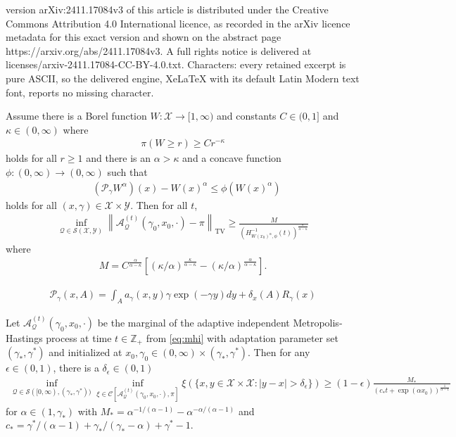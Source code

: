 \documentclass[10pt,a4paper]{amsart}
\newcommand{\A}{\mathcal{A}}
\newcommand{\C}{\mathcal{C}}
\newcommand{\Q}{\mathcal{Q}}
\newcommand{\X}{\mathcal{X}}
\newcommand{\Y}{\mathcal{Y}}
\newcommand{\Z}{\mathbb{Z}}
\newcommand{\eq}[1]{\begin{align*}#1\end{align*}}
\newcommand{\e}{\epsilon}
\newcommand{\norm}[1]{\left\lVert#1\right\rVert}
\renewcommand{\P}{\mathcal{P}}
\renewcommand{\S}{\mathcal{S}}
\begin{document}
version arXiv:2411.17084v3 of this article is distributed under the Creative Commons Attribution 4.0 International licence, as recorded in the arXiv licence metadata for this exact version and shown on the abstract page https://arxiv.org/abs/2411.17084v3. A full rights notice is delivered at licenses/arxiv-2411.17084-CC-BY-4.0.txt. Characters: every retained excerpt is pure ASCII, so the delivered engine, XeLaTeX with its default Latin Modern text font, reports no missing character.
\begin{theorem}
\label{theorem:lb_with_target_tails}
Assume there is a Borel function $W : \X \to [1, \infty)$ and constants $C \in (0, 1]$ and $\kappa \in (0, \infty)$ where
\begin{align}
\pi( W \ge r ) \ge C r^{-\kappa}
\label{eq:target_tail_lb}
\end{align}
holds for all $r \ge 1$ and there is an $\alpha > \kappa$ and a concave function $\phi : (0, \infty) \to (0, \infty)$ such that
\begin{align}
&(\P_\gamma W^{\alpha} )(x) - W(x)^\alpha  \le \phi( W(x)^\alpha )
\label{eq:lb_drift}
\end{align}
holds for all $(x, \gamma) \in \X \times \Y$.
Then for all $t$,
\eq{
\inf_{\Q \in \S(\X, \Y) } \norm{ \A_\Q^{(t)}(\gamma_0, x_0, \cdot) - \pi }_{\text{TV}}
\ge \frac{M}{ \left( H_{W(x_0)^\alpha, \phi}^{-1}(t) \right)^{\frac{\kappa}{\alpha - \kappa}}}
}
where 
\begin{align}
M = C^{\frac{\alpha}{\alpha - \kappa}} \left[ ( \kappa/\alpha )^{\frac{\kappa}{\alpha - \kappa}} - ( \kappa/\alpha )^{\frac{\alpha}{\alpha - \kappa}} \right].
\label{eq:M}
\end{align}
\end{theorem}

\begin{align}
\P_\gamma(x, A)
= \int_A a_\gamma(x, y) \gamma \exp(-\gamma y) dy
+ \delta_{x}(A) R_\gamma(x)
\label{eq:mhi}
\end{align}

\begin{proposition}
\label{proposition:lb_imh}
Let $\A_{\Q}^{(t)}(\gamma_0, x_0, \cdot)$ be the marginal of the adaptive independent Metropolis-Hastings process at time $t \in \Z_+$ from \eqref{eq:mhi} with adaptation parameter set $(\gamma_*, \gamma^*)$ and initialized at $x_0, \gamma_0 \in (0, \infty) \times (\gamma_*, \gamma^*)$.
Then for any $\e \in (0, 1)$, there is a $\delta_{\e} \in (0, 1)$
\begin{align*}
\inf_{\Q \in \S([0, \infty), (\gamma_*, \gamma^*)) } \inf_{\xi \in \C\left[ \A_{\Q}^{(t)}(\gamma_0, x_0, \cdot), \pi \right] } \xi( \{ x, y \in \X \times \X : |y - x| > \delta_{\e} \})
\ge (1 - \e) \frac{M_*}{ \left( c_* t + \exp(\alpha x_0) \right)^{\frac{1}{\alpha - 1}} }
\end{align*}
for $\alpha \in (1, \gamma_*)$ with $M_* = \alpha^{-1/(\alpha - 1)} - \alpha^{-\alpha/(\alpha - 1)}$ and $c_{*} = \gamma^* / (\alpha - 1)
+ \gamma_* / (\gamma_* - \alpha)
+ \gamma^* - 1$.
\end{proposition}
\end{document}
